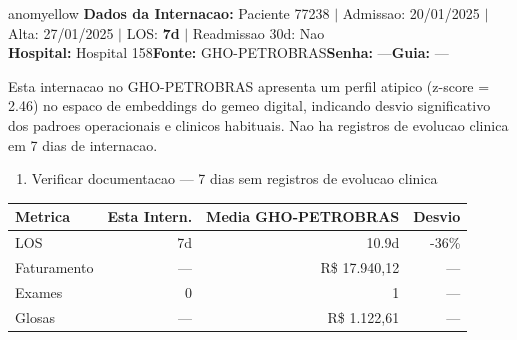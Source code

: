 \documentclass[a4paper,10pt]{article}
\begin{document}
\begin{anomalycard}[Internacao 119384 | GHO-PETROBRAS | MODERADO (z=2.46)]{anomyellow}
\textbf{Dados da Internacao:} Paciente 77238 $\mid$ Admissao: 20/01/2025 $\mid$ Alta: 27/01/2025 $\mid$ LOS: \textbf{7d} $\mid$ Readmissao 30d: Nao\\
\textbf{Hospital:} Hospital 158\quad\textbf{Fonte:} GHO-PETROBRAS\quad\textbf{Senha:} ---\quad\textbf{Guia:} ---\\
\vspace{2pt}\begin{tcolorbox}[colback=severityred!20,colframe=anomyellow,title={\textbf{Interpretacao de Negocio}},fonttitle=\bfseries\small,left=4pt,right=4pt,top=3pt,bottom=3pt]
{\small Esta internacao no GHO-PETROBRAS apresenta um perfil atipico (z-score = 2.46) no espaco de embeddings do gemeo digital, indicando desvio significativo dos padroes operacionais e clinicos habituais. Nao ha registros de evolucao clinica em 7 dias de internacao.}
\end{tcolorbox}
\begin{tcolorbox}[colback=severityyellow!30,colframe=anomorange,title={\textbf{Recomendacoes Especificas}},fonttitle=\bfseries\small,left=4pt,right=4pt,top=3pt,bottom=3pt]
\begin{enumerate}[nosep,leftmargin=16pt]
\item {\small Verificar documentacao --- 7 dias sem registros de evolucao clinica}
\end{enumerate}
\end{tcolorbox}
\begin{center}\begin{tabular}{l r r r}\toprule\textbf{Metrica} & \textbf{Esta Intern.} & \textbf{Media GHO-PETROBRAS} & \textbf{Desvio} \\\midrule
LOS & 7d & 10.9d & -36\% \\
Faturamento & --- & R\$ 17.940,12 & --- \\
Exames & 0 & 1 & --- \\
Glosas & --- & R\$ 1.122,61 & --- \\
\bottomrule\end{tabular}\end{center}


\end{anomalycard}
\end{document}
